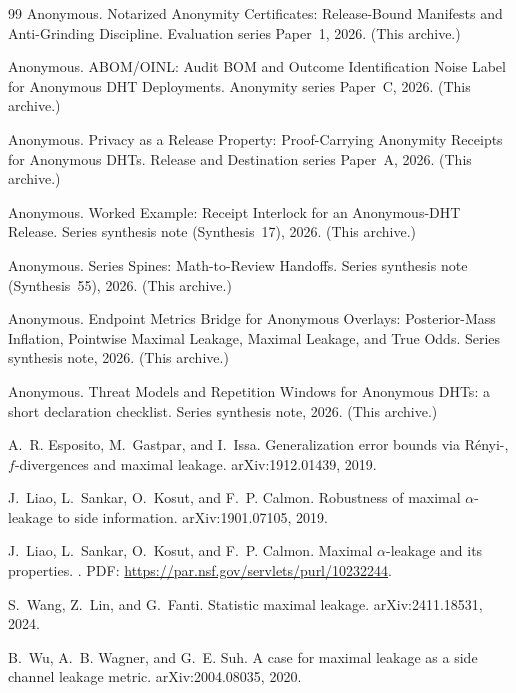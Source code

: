 \documentclass[11pt]{article}
\begin{document}
\begin{thebibliography}{99}
Anonymous.
\newblock Notarized Anonymity Certificates: Release-Bound Manifests and Anti-Grinding Discipline.
\newblock Evaluation series Paper~1, 2026. (This archive.)

Anonymous.
\newblock ABOM/OINL: Audit BOM and Outcome Identification Noise Label for Anonymous DHT Deployments.
\newblock Anonymity series Paper~C, 2026. (This archive.)

Anonymous.
\newblock Privacy as a Release Property: Proof-Carrying Anonymity Receipts for Anonymous DHTs.
\newblock Release and Destination series Paper~A, 2026. (This archive.)

Anonymous.
\newblock Worked Example: Receipt Interlock for an Anonymous-DHT Release.
\newblock Series synthesis note (Synthesis~17), 2026. (This archive.)

Anonymous.
\newblock Series Spines: Math-to-Review Handoffs.
\newblock Series synthesis note (Synthesis~55), 2026. (This archive.)

Anonymous.
\newblock Endpoint Metrics Bridge for Anonymous Overlays: Posterior-Mass Inflation, Pointwise Maximal Leakage, Maximal Leakage, and True Odds.
\newblock Series synthesis note, 2026. (This archive.)

Anonymous.
\newblock Threat Models and Repetition Windows for Anonymous DHTs: a short declaration checklist.
\newblock Series synthesis note, 2026. (This archive.)

A.~R. Esposito, M.~Gastpar, and I.~Issa.
\newblock Generalization error bounds via R\'enyi-, $f$-divergences and maximal leakage.
\newblock arXiv:1912.01439, 2019.

J.~Liao, L.~Sankar, O.~Kosut, and F.~P. Calmon.
\newblock Robustness of maximal $\alpha$-leakage to side information.
\newblock arXiv:1901.07105, 2019.

J.~Liao, L.~Sankar, O.~Kosut, and F.~P. Calmon.
\newblock Maximal $\alpha$-leakage and its properties.
. PDF: \url{https://par.nsf.gov/servlets/purl/10232244}.

S.~Wang, Z.~Lin, and G.~Fanti.
\newblock Statistic maximal leakage.
\newblock arXiv:2411.18531, 2024.

B.~Wu, A.~B. Wagner, and G.~E. Suh.
\newblock A case for maximal leakage as a side channel leakage metric.
\newblock arXiv:2004.08035, 2020.


\end{thebibliography}
\end{document}
